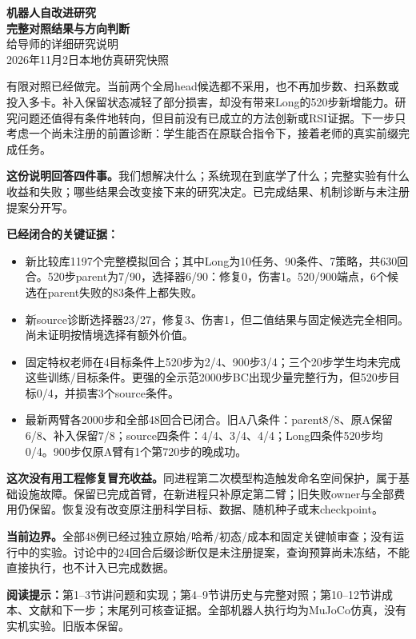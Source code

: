 \documentclass[UTF8,a4paper,fontset=none,zihao=-4]{ctexart}
\begin{document}
\begin{center}
{\LARGE\bfseries\color{ink}机器人自改进研究\\[0.3em]完整对照结果与方向判断}\\[0.7em]
{\large 给导师的详细研究说明}\\[0.4em]
2026年11月2日\quad 本地仿真研究快照
\end{center}
\vspace{0.7em}
\begin{keybox}[title=先说当前判断]
有限对照已经做完。当前两个全局head候选都不采用，也不再加步数、扫系数或投入多卡。补入保留状态减轻了部分损害，却没有带来Long的520步新增能力。研究问题还值得有条件地转向，但目前没有已成立的方法创新或RSI证据。下一步只考虑一个尚未注册的前置诊断：学生能否在原联合指令下，接着老师的真实前缀完成任务。
\end{keybox}
\textbf{这份说明回答四件事。}我们想解决什么；系统现在到底学了什么；完整实验有什么收益和失败；哪些结果会改变接下来的研究决定。已完成结果、机制诊断与未注册提案分开写。

\textbf{已经闭合的关键证据：}
\begin{itemize}
\item 新比较库1197个完整模拟回合；其中Long为10任务、90条件、7策略，共630回合。520步parent为7/90，选择器6/90：修复0，伤害1。520/900端点，6个候选在parent失败的83条件上都失败。
\item 新source诊断选择器23/27，修复3、伤害1，但二值结果与固定候选完全相同。尚未证明按情境选择有额外价值。
\item 固定特权老师在4目标条件上520步为2/4、900步3/4；三个20步学生均未完成这些训练/目标条件。更强的全示范2000步BC出现少量完整行为，但520步目标0/4，并损害3个source条件。
\item 最新两臂各2000步和全部48回合已闭合。旧A八条件：parent8/8、原A保留6/8、补入保留7/8；source四条件：4/4、3/4、4/4；Long四条件520步均0/4。900步仅原A臂有1个第720步的晚成功。
\end{itemize}
\textbf{这次没有用工程修复冒充收益。}同进程第二次模型构造触发命名空间保护，属于基础设施故障。保留已完成首臂，在新进程只补原定第二臂；旧失败owner与全部费用仍保留。恢复没有改变原注册科学目标、数据、随机种子或末checkpoint。

\textbf{当前边界。}全部48例已经过独立原始/哈希/初态/成本和固定关键帧审查；没有运行中的实验。讨论中的24回合后缀诊断仅是未注册提案，查询预算尚未冻结，不能直接执行，也不计入已完成数据。

\textbf{阅读提示：}第1--3节讲问题和实现；第4--9节讲历史与完整对照；第10--12节讲成本、文献和下一步；末尾列可核查证据。全部机器人执行均为MuJoCo仿真，没有实机实验。旧版本保留。
\newpage
\tableofcontents
\vspace{1em}
\end{document}
